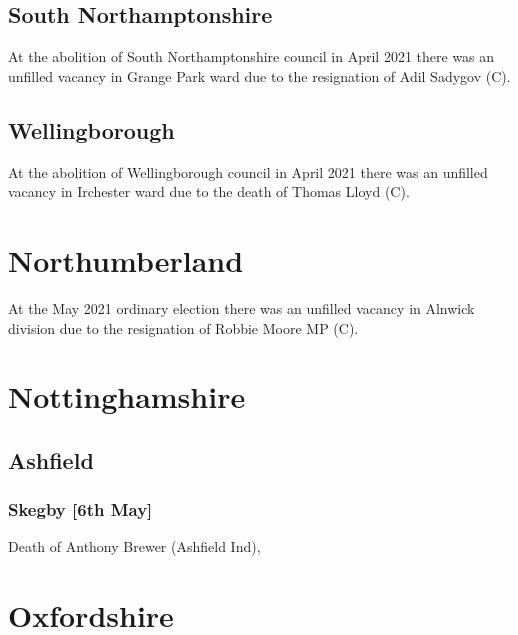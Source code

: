 \documentclass[a4paper,openany]{book}
\begin{document}
\begin{resultsiii}
\subsection*{South Northamptonshire}

At the abolition of South Northamptonshire council in April 2021 there was an unfilled vacancy in Grange Park ward due to the resignation of Adil Sadygov (C).

\subsection*{Wellingborough}

At the abolition of Wellingborough council in April 2021 there was an unfilled vacancy in Irchester ward due to the death of Thomas Lloyd (C).

\section{Northumberland}

At the May 2021 ordinary election there was an unfilled vacancy in Alnwick division due to the resignation of Robbie Moore MP (C).

\section{Nottinghamshire}

\subsection*{Ashfield}

\subsubsection*{Skegby \hspace*{\fill}\nolinebreak[1]%
	\enspace\hspace*{\fill}
	[6th May]}


Death of Anthony Brewer (Ashfield Ind),

\section{Oxfordshire}


\end{resultsiii}
\end{document}
